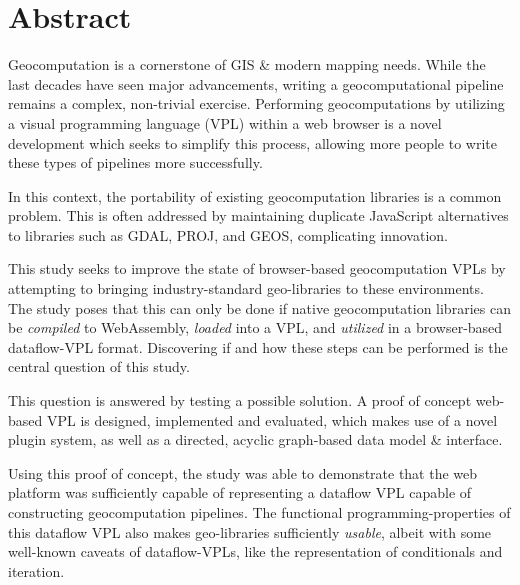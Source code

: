 \chapter*{Abstract}
Geocomputation is a cornerstone of GIS \& modern mapping needs.
While the last decades have seen major advancements, writing a geocomputational pipeline remains a complex, non-trivial exercise. 
Performing geocomputations by utilizing a visual programming language (VPL) within a web browser is a novel development which seeks to simplify this process, allowing more people to write these types of pipelines more successfully.

In this context, the portability of existing geocomputation libraries is a common problem.
This is often addressed by maintaining duplicate JavaScript alternatives to libraries such as GDAL, PROJ, and GEOS, complicating innovation.  

This study seeks to improve the state of browser-based geocomputation VPLs by attempting to bringing industry-standard geo-libraries to these environments. 
The study poses that this can only be done if native geocomputation libraries can be \emph{compiled} to WebAssembly, \emph{loaded} into a VPL, and \emph{utilized} in a browser-based dataflow-VPL format.
Discovering if and how these steps can be performed is the central question of this study. 

This question is answered by testing a possible solution.
A proof of concept web-based VPL is designed, implemented and evaluated, which makes use of a novel plugin system, as well as a directed, acyclic graph-based data model \& interface.

Using this proof of concept, the study was able to demonstrate that the web platform was sufficiently capable of representing a dataflow VPL capable of constructing geocomputation pipelines.
The functional programming-properties of this dataflow VPL also makes geo-libraries sufficiently \emph{usable}, albeit with some well-known caveats of dataflow-VPLs, like the representation of conditionals and iteration.  


